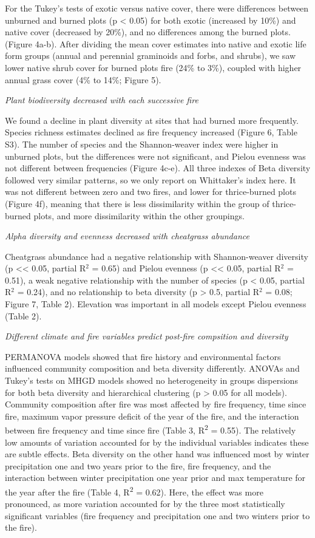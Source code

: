 \documentclass[12pt,]{article}
\begin{document}
For the Tukey's tests of exotic versus native cover, there were
differences between unburned and burned plots (p \textless{} 0.05) for
both exotic (increased by 10\%) and native cover (decreased by 20\%),
and no differences among the burned plots. (Figure 4a-b). After dividing
the mean cover estimates into native and exotic life form groups (annual
and perennial graminoids and forbs, and shrubs), we saw lower native
shrub cover for burned plots fire (24\% to 3\%), coupled with higher
annual grass cover (4\% to 14\%; Figure 5).

\emph{Plant biodiversity decreased with each successive fire}

We found a decline in plant diversity at sites that had burned more
frequently. Species richness estimates declined as fire frequency
increased (Figure 6, Table S3). The number of species and the
Shannon-weaver index were higher in unburned plots, but the differences
were not significant, and Pielou evenness was not different between
frequencies (Figure 4c-e). All three indexes of Beta diversity followed
very similar patterns, so we only report on Whittaker's index here. It
was not different between zero and two fires, and lower for
thrice-burned plots (Figure 4f), meaning that there is less
dissimilarity within the group of thrice-burned plots, and more
dissimilarity within the other groupings.

\emph{Alpha diversity and evenness decreased with cheatgrass abundance}

Cheatgrass abundance had a negative relationship with Shannon-weaver
diversity (p \textless{}\textless{} 0.05, partial R\(^2\) = 0.65) and
Pielou evenness (p \textless{}\textless{} 0.05, partial R\(^2\) = 0.51),
a weak negative relationship with the number of species (p \textless{}
0.05, partial R\(^2\) = 0.24), and no relationship to beta diversity (p
\textgreater{} 0.5, partial R\(^2\) = 0.08; Figure 7, Table 2).
Elevation was important in all models except Pielou evenness (Table 2).

\emph{Different climate and fire variables predict post-fire compsition
and diversity}

PERMANOVA models showed that fire history and environmental factors
influenced community composition and beta diversity differently. ANOVAs
and Tukey's tests on MHGD models showed no heterogeneity in groups
dispersions for both beta diversity and hierarchical clustering (p
\textgreater{} 0.05 for all models). Community composition after fire
was most affected by fire frequency, time since fire, maximum vapor
pressure deficit of the year of the fire, and the interaction between
fire frequency and time since fire (Table 3, R\textsuperscript{2} =
0.55). The relatively low amounts of variation accounted for by the
individual variables indicates these are subtle effects. Beta diversity
on the other hand was influenced most by winter precipitation one and
two years prior to the fire, fire frequency, and the interaction between
winter precipitation one year prior and max temperature for the year
after the fire (Table 4, R\textsuperscript{2} = 0.62). Here, the effect
was more pronounced, as more variation accounted for by the three most
statistically significant variables (fire frequency and precipitation
one and two winters prior to the fire).
\end{document}
